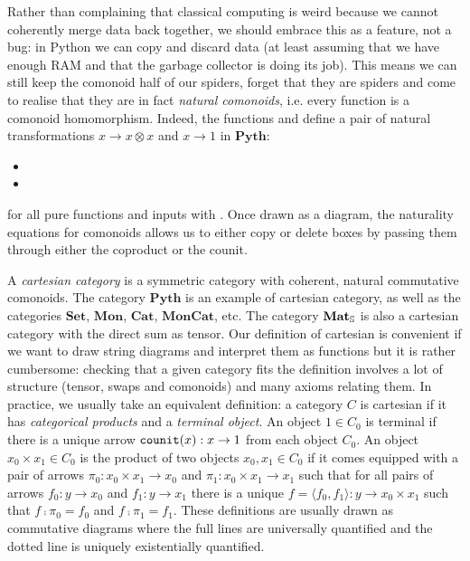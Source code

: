 Rather than complaining that classical computing is weird because we cannot coherently merge data back together, we should embrace this as a feature, not a bug: in Python we can copy and discard data (at least assuming that we have enough RAM and that the garbage collector is doing its job).
This means we can still keep the comonoid half of our spiders, forget that they are spiders and come to realise that they are in fact \emph{natural comonoids}, i.e. every function is a comonoid homomorphism.
Indeed, the functions  and  define a pair of natural transformations $x \to x \otimes x$ and $x \to 1$ in $\mathbf{Pyth}$:
\begin{itemize}
    \item {}
    \item {}
\end{itemize}
for all pure functions  and inputs  with .
Once drawn as a diagram, the naturality equations for comonoids allows us to either copy or delete boxes by passing them through either the coproduct or the counit.


A \emph{cartesian category} is a symmetric category with coherent, natural commutative comonoids.
The category $\mathbf{Pyth}$ is an example of cartesian category, as well as the categories $\mathbf{Set}$, $\mathbf{Mon}$, $\mathbf{Cat}$, $\mathbf{MonCat}$, etc.
The category $\mathbf{Mat}_\S$ is also a cartesian category with the direct sum as tensor.
Our definition of cartesian is convenient if we want to draw string diagrams and interpret them as functions but it is rather cumbersome: checking that a given category fits the definition involves a lot of structure (tensor, swaps and comonoids) and many axioms relating them.
In practice, we usually take an equivalent definition: a category $C$ is cartesian if it has \emph{categorical products} and a \emph{terminal object}.
An object $1 \in C_0$ is terminal if there is a unique arrow $\counit(x) : x \to 1$ from each object $C_0$.
An object $x_0 \times x_1 \in C_0$ is the product of two objects $x_0, x_1 \in C_0$ if it comes equipped with a pair of arrows $\pi_0 : x_0 \times x_1 \to x_0$ and $\pi_1 : x_0 \times x_1 \to x_1$
such that for all pairs of arrows $f_0 : y \to x_0$ and $f_1 : y \to x_1$ there is a unique $f = \langle f_0, f_1 \rangle : y \to x_0 \times x_1$ such that $f \fcmp \pi_0 = f_0$ and $f \fcmp \pi_1 = f_1$.
These definitions are usually drawn as commutative diagrams where the full lines are universally quantified and the dotted line is uniquely existentially quantified.

